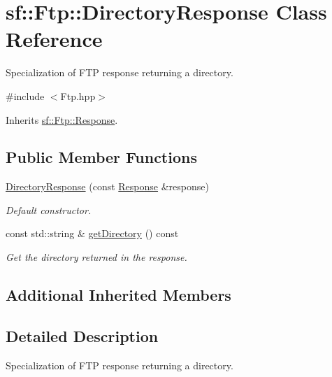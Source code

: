 \hypertarget{classsf_1_1_ftp_1_1_directory_response}{\section{sf\+:\+:Ftp\+:\+:Directory\+Response Class Reference}
\label{classsf_1_1_ftp_1_1_directory_response}
}


Specialization of F\+T\+P response returning a directory.  




{\ttfamily \#include $<$Ftp.\+hpp$>$}



Inherits \hyperlink{classsf_1_1_ftp_1_1_response}{sf\+::\+Ftp\+::\+Response}.

\subsection*{Public Member Functions}
\begin{DoxyCompactItemize}
\item 
\hyperlink{classsf_1_1_ftp_1_1_directory_response_a36b6d2728fa53c4ad37b7a6307f4d388}{Directory\+Response} (const \hyperlink{classsf_1_1_ftp_1_1_response}{Response} \&response)
\begin{DoxyCompactList}\small\item\em Default constructor. \end{DoxyCompactList}\item 
const std\+::string \& \hyperlink{classsf_1_1_ftp_1_1_directory_response_a500793778ad0ed223aa86ed8fbee28a3}{get\+Directory} () const 
\begin{DoxyCompactList}\small\item\em Get the directory returned in the response. \end{DoxyCompactList}\end{DoxyCompactItemize}
\subsection*{Additional Inherited Members}


\subsection{Detailed Description}
Specialization of F\+T\+P response returning a directory. 


